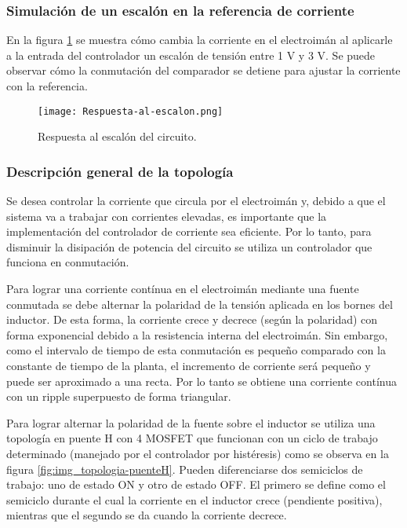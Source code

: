 \subsubsection{Simulación de un escalón en la referencia de corriente}

\noindent En la figura \ref{fig:img_respuesta-al-escalon} se muestra cómo cambia la corriente en el electroimán al aplicarle a la entrada del controlador un escalón de tensión entre 1 V y 3 V. Se puede observar cómo la conmutación del comparador se detiene para ajustar la corriente con la referencia.

\begin{figure}[H]
	\centering
	\texttt{[image: Respuesta-al-escalon.png]}
	\caption{Respuesta al escalón del circuito.}
	\label{fig:img_respuesta-al-escalon}
\end{figure}


\subsubsection{Descripción general de la topología}

\noindent Se desea controlar la corriente que circula por el electroimán y, debido a que el sistema va a trabajar con corrientes elevadas, es importante que la implementación del controlador de corriente sea eficiente. Por lo tanto, para disminuir la disipación de potencia del circuito se utiliza un controlador que funciona en conmutación. 

\noindent Para lograr una corriente contínua en el electroimán mediante una fuente conmutada se debe alternar la polaridad de la tensión aplicada en los bornes del inductor. De esta forma, la corriente crece y decrece (según la polaridad) con forma exponencial debido a la resistencia interna del electroimán. Sin embargo, como el intervalo de tiempo de esta conmutación es pequeño comparado con la constante de tiempo de la planta, el incremento de corriente será pequeño y puede ser aproximado a una recta. Por lo tanto se obtiene una corriente contínua con un ripple superpuesto de forma triangular. 

\noindent Para lograr alternar la polaridad de la fuente sobre el inductor se utiliza una topología en puente H con 4 MOSFET que funcionan con un ciclo de trabajo determinado (manejado por el controlador por histéresis) como se observa en la figura \ref{fig:img_topologia-puenteH}. Pueden diferenciarse dos semiciclos de trabajo: uno de estado ON y otro de estado OFF. El primero se define como el semiciclo durante el cual la corriente en el inductor crece (pendiente positiva), mientras que el segundo se da cuando la corriente decrece.

